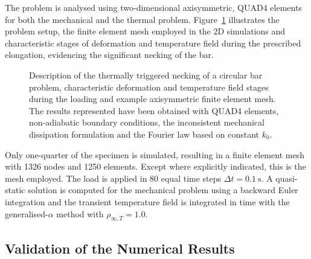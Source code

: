 The problem is analysed using two-dimensional axisymmetric, QUAD4 elements for both the mechanical and the thermal problem.
Figure~\ref{fig:necking} illustrates the problem setup, the finite element mesh employed in the 2D simulations and characteristic stages of deformation and temperature field during the prescribed elongation, evidencing the significant necking of the bar.
%
\begin{figure}[p]
  \centering
  \def\svgwidth{1.0\linewidth}
  \footnotesize
  
  \caption{Description of the thermally triggered necking of a circular bar problem, characteristic deformation and temperature field stages during the loading and example axisymmetric finite element mesh. The results represented have been obtained with QUAD4 elements, non-adiabatic boundary conditions, the inconsistent mechanical dissipation formulation and the Fourier law based on constant $k_{0}$.}
  \label{fig:necking}
\end{figure}
%
Only one-quarter of the specimen is simulated, resulting in a finite element mesh with 1326 nodes and 1250 elements.
Except where explicitly indicated, this is the mesh employed.
The load is applied in 80 equal time steps $\Delta t = \SI{0.1}{\second}$.
A quasi-static solution is computed for the mechanical problem using a backward Euler integration and the transient temperature field is integrated in time with the generalised-$\alpha$ method with $\rho_{\infty,T}=1.0$.

\subsection{Validation of the Numerical Results}

